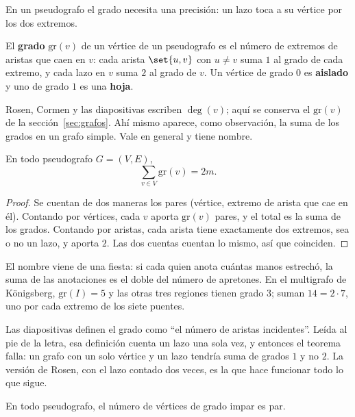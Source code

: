 \documentclass[11pt,letterpaper]{article}
\begin{document}
En un pseudografo el grado necesita una precisión: un lazo toca a su
vértice por los dos extremos.

\begin{definicion}[Grado]
  \label{def:grado-lazos}
  El \textbf{grado} $\text{gr}(v)$ de un vértice de un pseudografo es
  el número de extremos de aristas que caen en $v$: cada arista
  $\set{u, v}$ con $u \neq v$ suma $1$ al grado de cada extremo, y cada
  lazo en $v$ suma $2$ al grado de $v$. Un vértice de grado $0$ es
  \textbf{aislado} y uno de grado $1$ es una \textbf{hoja}.
\end{definicion}

Rosen, Cormen y las diapositivas escriben $\deg(v)$; aquí se conserva
el $\text{gr}(v)$ de la sección~\ref{sec:grafos}. Ahí mismo aparece,
como observación, la suma de los grados en un grafo simple. Vale en
general y tiene nombre.

\begin{teorema}
  \label{teo:apreton-manos}
  En todo pseudografo $G = (V, E)$,
  \[
    \sum_{v \in V} \text{gr}(v) = 2m .
  \]
\end{teorema}

\begin{proof}
  Se cuentan de dos maneras los pares (vértice, extremo de arista que
  cae en él). Contando por vértices, cada $v$ aporta $\text{gr}(v)$
  pares, y el total es la suma de los grados. Contando por aristas,
  cada arista tiene exactamente dos extremos, sea o no un lazo, y
  aporta $2$. Las dos cuentas cuentan lo mismo, así que coinciden.
\end{proof}

El nombre viene de una fiesta: si cada quien anota cuántas manos
estrechó, la suma de las anotaciones es el doble del número de
apretones. En el multigrafo de Königsberg, $\text{gr}(I) = 5$ y las
otras tres regiones tienen grado $3$; suman $14 = 2 \cdot 7$, uno por
cada extremo de los siete puentes.

\begin{ojo}
  Las diapositivas definen el grado como ``el número de aristas
  incidentes''. Leída al pie de la letra, esa definición cuenta un lazo
  una sola vez, y entonces el teorema falla: un grafo con un solo
  vértice y un lazo tendría suma de grados $1$ y no $2$. La versión de Rosen, con el lazo contado dos
  veces, es la que hace funcionar todo lo que sigue.
\end{ojo}

\begin{corolario}
  \label{cor:impares-par}
  En todo pseudografo, el número de vértices de grado impar es par.
\end{corolario}
\end{document}
